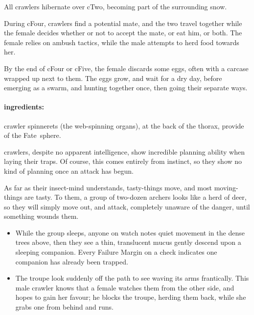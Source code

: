 \begin{multicols}{2}
All \glspl{crawler} hibernate over \gls{cTwo}, becoming part of the surrounding snow.

During \gls{cFour}, \glspl{crawler} find a potential mate, and the two travel together while the female decides whether or not to accept the mate, or eat him, or both.
The female relies on ambush tactics, while the male attempts to herd food towards her.

By the end of \gls{cFour} or \gls{cFive}, the female discards some eggs, often with a carcase wrapped up next to them.
The eggs grow, and wait for a dry day, before emerging as a swarm, and hunting together once, then going their separate ways.

\crawlerSwarm
\label{crawlerSwarm}

\paragraph{\Glspl{ingredient}:}
\gls{crawler} spinnerets (the web-spinning organs), at the back of the thorax, provide   of the Fate~\gls{sphere}.

\showEnc\label{chitin:tactics}
\Glspl{crawler}, despite no apparent intelligence, show incredible planning ability when laying their traps.
Of course, this comes entirely from instinct, so they show no kind of planning once an attack has begun.

As far as their insect-mind understands, tasty-things move, and most moving-things are tasty.
To them, a group of two-dozen archers looks like a herd of deer, so they will simply move out, and attack, completely unaware of the danger, until something wounds them.

\begin{itemize}
  \item
  While the group sleeps, anyone on watch notes quiet movement in the dense trees above, then they see a thin, translucent mucus gently descend upon a sleeping companion.
  Every Failure Margin on a  check indicates one companion has already been trapped.
  \item
    The troupe look suddenly off the path to see  waving its arms frantically.
    This male \gls{crawler} knows that a female watches them from the other side, and hopes to gain her favour; he blocks the troupe, herding them back, while she grabs one from behind and runs.


\end{itemize}
\end{multicols}
